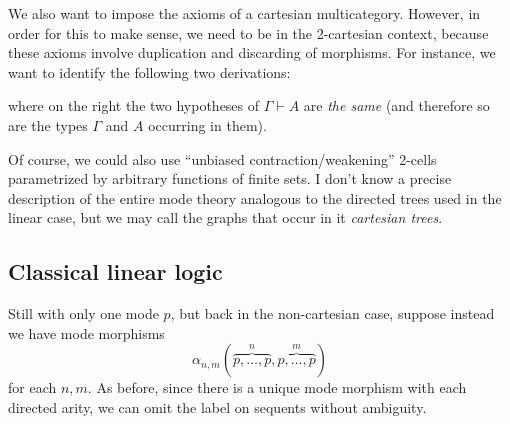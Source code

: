 \documentclass{article}
\theoremstyle{definition}
\theoremstyle{remark}
\let\types\vdash
\begin{document}
We also want to impose the axioms of a cartesian multicategory.
However, in order for this to make sense, we need to be in the 2-cartesian context, because these axioms involve duplication and discarding of morphisms.
For instance, we want to identify the following two derivations:
where on the right the two hypotheses of $\Gamma\types A$ are \emph{the same} (and therefore so are the types $\Gamma$ and $A$ occurring in them).

Of course, we could also use ``unbiased contraction/weakening'' 2-cells parametrized by arbitrary functions of finite sets.
I don't know a precise description of the entire mode theory analogous to the directed trees used in the linear case, but we may call the graphs that occur in it \emph{cartesian trees}.


\subsection{Classical linear logic}
\label{sec:cll}

Still with only one mode $p$, but back in the non-cartesian case, suppose instead we have mode morphisms
\[\alpha_{n,m}(\overbrace{p,\dots,p}^n,\overbrace{p,\dots,p}^m)\]
for each $n,m$.
As before, since there is a unique mode morphism with each directed arity, we can omit the label on sequents without ambiguity.
\end{document}
